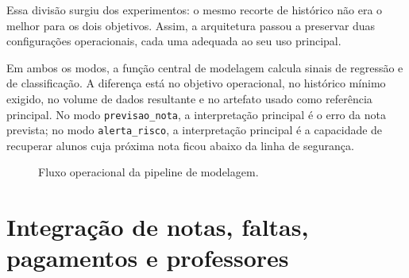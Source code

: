 Essa divis\~ao surgiu dos experimentos: o mesmo recorte de hist\'orico n\~ao era o melhor para os dois objetivos. Assim, a arquitetura passou a preservar duas configura\c{c}\~oes operacionais, cada uma adequada ao seu uso principal.

Em ambos os modos, a fun\c{c}\~ao central de modelagem calcula sinais de regress\~ao e de classifica\c{c}\~ao. A diferen\c{c}a est\'a no objetivo operacional, no hist\'orico m\'inimo exigido, no volume de dados resultante e no artefato usado como refer\^encia principal. No modo \texttt{previsao\_nota}, a interpreta\c{c}\~ao principal \'e o erro da nota prevista; no modo \texttt{alerta\_risco}, a interpreta\c{c}\~ao principal \'e a capacidade de recuperar alunos cuja pr\'oxima nota ficou abaixo da linha de seguran\c{c}a.

\begin{figure}[ht]
\caption{Fluxo operacional da pipeline de modelagem.}
\label{fig:fluxo-pipeline}
\centering
{}
\end{figure}

\section{Integra\c{c}\~ao de notas, faltas, pagamentos e professores}
\label{sec:integracao}

